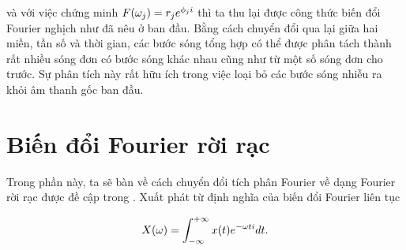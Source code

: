 		\noindent và với việc chứng minh $F(\omega_j) = r_je^{\phi_ji}$ thì ta thu lại được công thức biến đổi Fourier nghịch như đã nêu ở ban đầu. Bằng cách chuyển đổi qua lại giữa hai miền, tần số và thời gian, các bước sóng tổng hợp có thể được phân tách thành rất nhiều sóng đơn có bước sóng khác nhau cũng như từ một số sóng đơn cho trước. Sự phân tích này rất hữu ích trong việc loại bỏ các bước sóng nhiễu ra khỏi âm thanh gốc ban đầu.
		
		
	\section{Biến đổi Fourier rời rạc}
		
		Trong phần này, ta sẽ bàn về cách chuyển đổi tích phân Fourier về dạng Fourier rời rạc được đề cập trong . Xuất phát từ định nghĩa của biến đổi Fourier liên tục
	
			
				\begin{equation*}
					X(\omega) = \int_{-\infty}^{+\infty} x(t)e^{-\omega ti} dt.
				\end{equation*}
			
			
			
				
			
